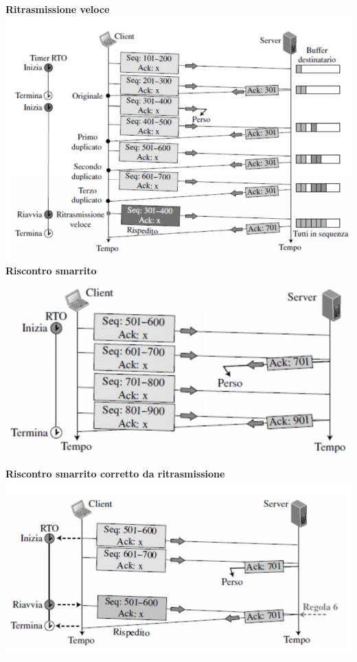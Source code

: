 \documentclass[10pt]{article}
\begin{document}
\begin{center}
\textbf{Ritrasmissione veloce}
\includegraphics[scale=0.7]{tcpfastretr.png}\\
\textbf{Riscontro smarrito}
\includegraphics[scale=0.7]{tcplostack2.png}
\pagebreak


\textbf{Riscontro smarrito corretto da ritrasmissione}
\includegraphics[scale=0.7]{tcpostackretransm.png}
\pagebreak


\end{center}
\end{document}
